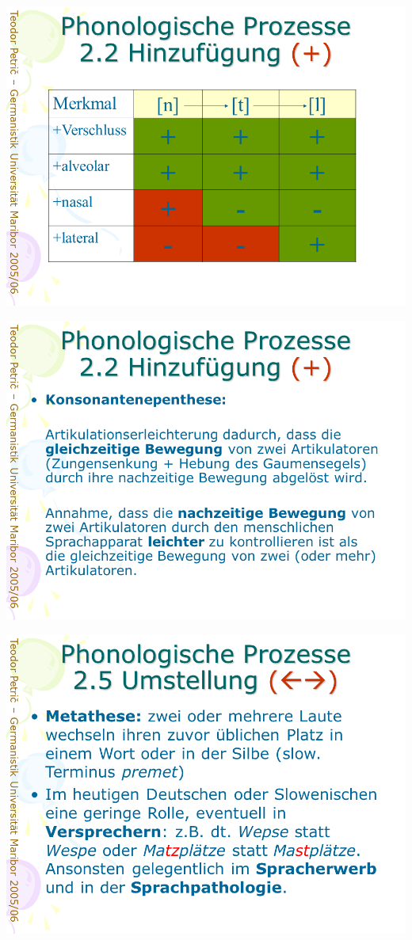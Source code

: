 \documentclass[
  letterpaper,
]{scrbook}
\begin{document}
\includegraphics[width=1\textwidth,height=\textheight]{./pictures/prozesse/prozesse_15.PNG}

\includegraphics[width=1\textwidth,height=\textheight]{./pictures/prozesse/prozesse_16.PNG}

\includegraphics[width=1\textwidth,height=\textheight]{./pictures/prozesse/prozesse_17.PNG}
\end{document}
